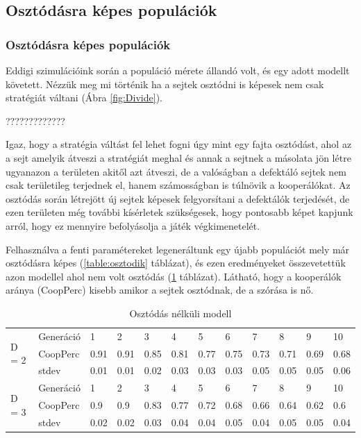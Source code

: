 \subsection{Osztódásra képes populációk}
\begin{frame}
\frametitle{Osztódásra képes populációk}
Eddigi szimulációink során a populáció mérete állandó volt, és egy adott modellt követett. Nézzük meg mi történik ha a sejtek osztódni is képesek nem csak stratégiát váltani (Ábra \ref{fig:Divide}). 

?????????????

Igaz, hogy a stratégia váltást fel lehet fogni úgy mint egy fajta osztódást, ahol az a sejt amelyik átveszi a stratégiát meghal és annak a sejtnek a másolata jön létre ugyanazon a területen akitől azt átveszi, de a valóságban a defektáló sejtek nem csak területileg terjednek el, hanem számosságban is túlnövik a kooperálókat.
Az osztódás során létrejött új sejtek képesek felgyorsítani a defektálók terjedését, de ezen területen még további kísérletek szükségesek, hogy pontosabb képet kapjunk arról, hogy ez mennyire befolyásolja a játék végkimenetelét.

Felhasználva a fenti paramétereket legeneráltunk egy újabb populációt mely már osztódásra képes (\ref{table:osztodik} táblázat), és ezen eredményeket összevetettük azon modellel ahol nem volt osztódás (\ref{table:nemOsztodik} táblázat). Látható, hogy a kooperálók aránya (CoopPerc) kisebb amikor a sejtek osztódnak, de a szórása is nő.

\begin{table}[htb]
	\caption{Osztódás nélküli modell \label{table:nemOsztodik}}
	\begin{tabular}{ | l | l | l | l | l | l | l | l | l | l | l | l | }
		\hline
		\multirow{3}{*}{D = 2}
		& Generáció & 1 & 2 & 3 & 4 & 5 & 6 & 7 & 8 & 9 & 10 \\ \cline{2-12}
		& CoopPerc & 0.91 & 0.91 & 0.85 & 0.81 & 0.77 & 0.75 & 0.73 & 0.71 & 0.69 & 0.68 \\ \cline{2-12}
		& stdev & 0.01 & 0.01 & 0.02 & 0.03 & 0.03 & 0.03 & 0.05 & 0.05 & 0.05 & 0.06 \\ \hline
		\multirow{3}{*}{D = 3}
		& Generáció & 1 & 2 & 3 & 4 & 5 & 6 & 7 & 8 & 9 & 10 \\ \cline{2-12}
		& CoopPerc & 0.9 & 0.9 & 0.83 & 0.77 & 0.72 & 0.68 & 0.66 & 0.64 & 0.62 & 0.6 \\ \cline{2-12}
		& stdev & 0.02 & 0.02 & 0.03 & 0.04 & 0.04 & 0.05 & 0.04 & 0.05 & 0.05 & 0.04 \\ \hline
	\end{tabular}
\end{table}


\end{frame}

